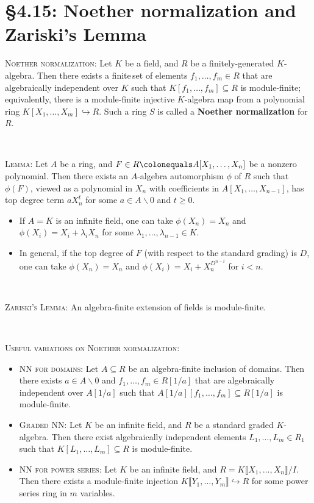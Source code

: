 \documentclass[12pt]{amsart}
\newcommand{\1}{\mathbbm{1}}
\newcommand{\showsol}[1]{\def\displaysol{#1}}
\newcommand\ceq{\colonequals}
\begin{document}
\showsol{0}
	
	\thispagestyle{empty}
	
	\section*{\S4.15: Noether normalization and Zariski's Lemma}	

\begin{framed}

\noindent \textsc{Noether normalization:} Let $K$ be a field, and $R$ be a finitely-generated $K$-algebra. Then there exists a finite\footnotemark\,set of elements $f_1,\dots,f_m\in R$ that are algebraically independent over $K$ such that $K[f_1,\dots,f_m] \subseteq R$ is module-finite; equivalently, there is a module-finite injective $K$-algebra map from a polynomial ring ${K[X_1,\dots,X_m] \hookrightarrow R}$. Such a ring $S$ is called a \textbf{Noether normalization} for~$R$.

\

\noindent \textsc{Lemma:} Let $A$ be a ring, and $F \in R \ceq A[X_1,\dots,X_n]$ be a nonzero polynomial. Then there exists an $A$-algebra automorphism $\phi$ of $R$ such that $\phi(F)$, viewed as a polynomial in $X_n$ with coefficients in $A[X_1,\dots, X_{n-1}]$, has top degree term $a X_n^t$ for some $a\in A\smallsetminus 0$ and $t\geq 0$.
\begin{itemize}
\item If $A=K$ is an infinite field, one can take $\phi(X_n)=X_n$ and $\phi(X_i) = X_i +\lambda_i X_n$ for some $\lambda_1,\dots,\lambda_{n-1} \in K$.
\item In general, if the top degree of $F$ (with respect to the standard grading) is $D$, one can take $\phi(X_n) = X_n$ and $\phi(X_i) = X_i + X_n^{D^{n-i}}$ for $i<n$.
\end{itemize}

\


\noindent \textsc{Zariski's Lemma:} An algebra-finite extension of fields is module-finite.

\

\noindent \textsc{Useful variations on Noether normalization:}
\begin{itemize}
\item \textsc{NN for domains:} Let $A\subseteq R$ be an algebra-finite inclusion of domains\footnotemark. Then there exists $a\in A\smallsetminus 0$ and $f_1,\dots,f_m\in R[1/a]$ that are algebraically independent over $A[1/a]$ such that $A[1/a][f_1,\dots,f_m] \subseteq R[1/a]$ is module-finite.
\item \textsc{Graded NN:} Let $K$ be an infinite field, and $R$ be a standard graded $K$-algebra. Then there exist algebraically independent elements $L_1,\dots,L_m \in R_1$ such that $K[L_1,\dots,L_m] \subseteq R$ is module-finite.
\item \textsc{NN for power series:} Let $K$ be an infinite field, and $R=K\llbracket X_1,\dots,X_n \rrbracket / I$. Then there exists a module-finite injection $K\llbracket Y_1,\dots,Y_m \rrbracket \hookrightarrow R$ for some power series ring in $m$ variables.
\end{itemize}

 \end{framed}
\end{document}
